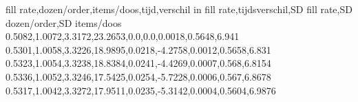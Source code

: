 fill rate,dozen/order,items/doos,tijd,verschil in fill rate,tijdsverschil,SD fill rate,SD dozen/order,SD items/doos
0.5082,1.0072,3.3172,23.2653,0.0,0.0,0.0018,0.5648,6.941
0.5301,1.0058,3.3226,18.9895,0.0218,-4.2758,0.0012,0.5658,6.831
0.5323,1.0054,3.3238,18.8384,0.0241,-4.4269,0.0007,0.568,6.8154
0.5336,1.0052,3.3246,17.5425,0.0254,-5.7228,0.0006,0.567,6.8678
0.5317,1.0042,3.3272,17.9511,0.0235,-5.3142,0.0004,0.5604,6.9876
